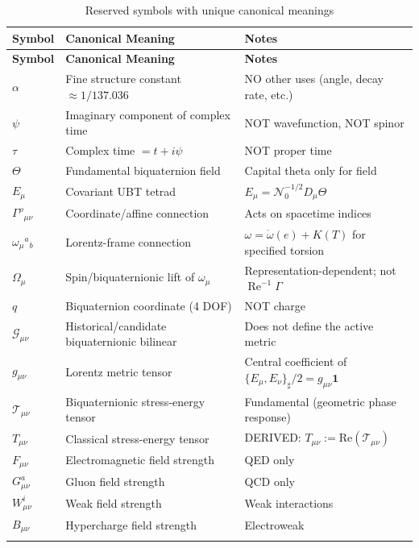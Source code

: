 \begin{longtable}{|l|p{6cm}|p{5cm}|}
\hline
\textbf{Symbol} & \textbf{Canonical Meaning} & \textbf{Notes} \\
\hline
\endfirsthead
\hline
\textbf{Symbol} & \textbf{Canonical Meaning} & \textbf{Notes} \\
\hline
\endhead

$\alpha$ & Fine structure constant $\approx 1/137.036$ & NO other uses (angle, decay rate, etc.) \\
\hline
$\psi$ & Imaginary component of complex time & NOT wavefunction, NOT spinor \\
\hline
$\tau$ & Complex time $= t + i\psi$ & NOT proper time \\
\hline
$\Theta$ & Fundamental biquaternion field & Capital theta only for field \\
\hline
$E_\mu$ & Covariant UBT tetrad & $E_\mu=\mathcal N_0^{-1/2}D_\mu\Theta$ \\
\hline
$\Gamma^\rho{}_{\mu\nu}$ & Coordinate/affine connection & Acts on spacetime indices \\
\hline
$\omega_\mu{}^a{}_b$ & Lorentz-frame connection & $\omega=\mathring\omega(e)+K(T)$ for specified torsion \\
\hline
$\Omega_\mu$ & Spin/biquaternionic lift of $\omega_\mu$ & Representation-dependent; not $\operatorname{Re}^{-1}\Gamma$ \\
\hline
$q$ & Biquaternion coordinate (4 DOF) & NOT charge \\
\hline
$\mathcal{G}_{\mu\nu}$ & Historical/candidate biquaternionic bilinear & Does not define the active metric \\
\hline
$g_{\mu\nu}$ & Lorentz metric tensor & Central coefficient of $\{E_\mu,E_\nu\}_\sharp/2=g_{\mu\nu}\mathbf1$ \\
\hline
$\mathcal{T}_{\mu\nu}$ & Biquaternionic stress-energy tensor & Fundamental (geometric phase response) \\
\hline
$T_{\mu\nu}$ & Classical stress-energy tensor & DERIVED: $T_{\mu\nu} := \text{Re}(\mathcal{T}_{\mu\nu})$ \\
\hline
$F_{\mu\nu}$ & Electromagnetic field strength & QED only \\
\hline
$G^a_{\mu\nu}$ & Gluon field strength & QCD only \\
\hline
$W^i_{\mu\nu}$ & Weak field strength & Weak interactions \\
\hline
$B_{\mu\nu}$ & Hypercharge field strength & Electroweak \\
\hline

\caption{Reserved symbols with unique canonical meanings}
\label{tab:canonical:reserved_symbols}
\end{longtable}

